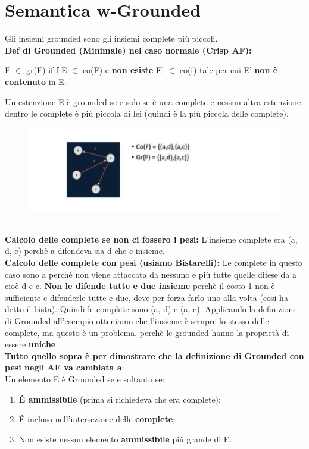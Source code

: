\section{Semantica w-Grounded}
Gli insiemi grounded sono gli insiemi complete più piccoli.
\\\textbf{Def di Grounded (Minimale) nel caso normale (Crisp AF):}
\begin{center}
    E $\in$ gr(F) if f E $\in$ co(F) e \textbf{non esiste} E' $\in$ co(f) tale per cui E' \textbf{non è contenuto} in E.
\end{center}
Un estenzione E è grounded se e solo se è una complete e nessun altra estenzione dentro le complete è più piccola di lei (quindi è la più piccola delle complete).
\begin{figure}[htp]
	\centering
    \includegraphics[width=12cm, keepaspectratio]{img/Cap6/w-grounded.png}
\end{figure}
\\\textbf{Calcolo delle complete se non ci fossero i pesi:} L’insieme complete era (a, d, c) perchè a difendeva sia d che c insieme. 
\\\textbf{Calcolo delle complete con pesi (usiamo Bistarelli):} Le complete in questo caso sono a perchè non viene attaccata da nessuno e più tutte quelle difese da a cioè d e c. \textbf{Non le difende tutte e due insieme} perchè il costo 1 non è sufficiente e difenderle tutte e due, deve per forza farlo uno alla volta (cosi ha detto il bista). Quindi le complete sono (a, d) e (a, c). Applicando la definizione di Grounded all’esempio otteniamo che l’insieme è sempre lo stesso delle complete, ma questo è un problema, perchè le grounded hanno la proprietà di essere \textbf{uniche}.
\\\textbf{Tutto quello sopra è per dimostrare che la definizione di Grounded con pesi negli AF va cambiata a}:\\
Un elemento E è Grounded se e soltanto se:
\begin{enumerate}
    \item \textbf{ É ammissibile} (prima si richiedeva che era complete);
    \item  É incluso nell’intersezione delle \textbf{complete};
    \item  Non esiste nessun elemento \textbf{ammissibile} più grande di E.
\end{enumerate}
